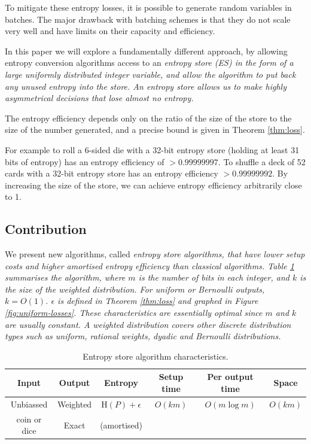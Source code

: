 \documentclass[12pt]{article}
\newcommand{\entropy}[1]{\mathrm{H}(#1)}
\begin{document}
To mitigate these entropy losses, it is possible to generate random variables in batches. The major drawback with batching schemes is that they do not scale very well and have limits on their capacity and efficiency.

In this paper we will explore a fundamentally different approach, by allowing entropy conversion algorithms access to an \em entropy store \em (ES) in the form of a large uniformly distributed integer variable, and allow the algorithm to put back any unused entropy into the store. An entropy store allows us to make highly asymmetrical decisions that lose almost no entropy.

The entropy efficiency depends only on the ratio of the size of the store to the size of the number generated, and a precise bound is given in Theorem \ref{thm:loss}. 

For example to roll a 6-sided die with a 32-bit entropy store (holding at least 31 bits of entropy) has an entropy efficiency of $>0.99999997$. To shuffle a deck of 52 cards with a 32-bit entropy store has an entropy efficiency $>0.99999992$. By increasing the size of the store, we can achieve entropy efficiency arbitrarily close to 1.


\subsection {Contribution}

We present new algorithms, called \em entropy store algorithms\em, that have lower setup costs and higher amortised entropy efficiency than classical algorithms. Table \ref{tab:entropy-store} summarises the algorithm, where $m$ is the number of bits in each integer, and $k$ is the size of the weighted distribution. For uniform or Bernoulli outputs, $k=O(1)$. $\epsilon$ is defined in Theorem \ref{thm:loss} and graphed in Figure \ref{fig:uniform-losses}. These characteristics are essentially optimal since $m$ and $k$ are usually constant.  A weighted distribution covers other discrete distribution types such as uniform, rational weights, dyadic and Bernoulli distributions.

\begin{table}[h!]
\centering
\begin{tabular}{|c|c|c|c|c|c|}
\hline
Input & Output & Entropy & Setup time & Per output time & Space \\
\hline
Unbiassed & Weighted & $\entropy{P}+\epsilon$ & $O(km)$ & $O(m \log m)$ & $O(km)$ \\
coin or dice & Exact & (amortised) & & &  \\
\hline
\end{tabular}
\caption{Entropy store algorithm characteristics.}
    \label{tab:entropy-store}
\end{table}
\end{document}
